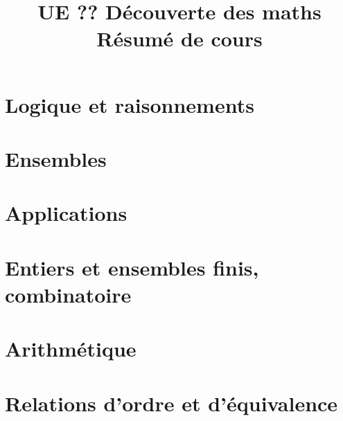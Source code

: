 \documentclass[10pt,a4paper]{book}
\theoremstyle{definition}
\begin{document}
\title{UE ?? Découverte des maths\\
Résumé de cours}
\maketitle
\tableofcontents




\chapter{Logique et raisonnements}


\chapter{Ensembles}


\chapter{Applications}


\chapter{Entiers et ensembles finis, combinatoire}


\chapter{Arithmétique}


\chapter{Relations d'ordre et d'équivalence}

\end{document}
